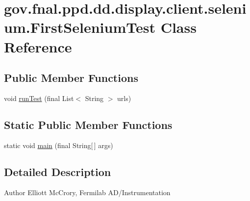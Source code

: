 \hypertarget{classgov_1_1fnal_1_1ppd_1_1dd_1_1display_1_1client_1_1selenium_1_1FirstSeleniumTest}{\section{gov.\-fnal.\-ppd.\-dd.\-display.\-client.\-selenium.\-First\-Selenium\-Test Class Reference}
\label{classgov_1_1fnal_1_1ppd_1_1dd_1_1display_1_1client_1_1selenium_1_1FirstSeleniumTest}
}
\subsection*{Public Member Functions}
\begin{DoxyCompactItemize}
\item 
void \hyperlink{classgov_1_1fnal_1_1ppd_1_1dd_1_1display_1_1client_1_1selenium_1_1FirstSeleniumTest_a2d2a0e6d397cb83c11e764529ea355e5}{run\-Test} (final List$<$ String $>$ urls)
\end{DoxyCompactItemize}
\subsection*{Static Public Member Functions}
\begin{DoxyCompactItemize}
\item 
static void \hyperlink{classgov_1_1fnal_1_1ppd_1_1dd_1_1display_1_1client_1_1selenium_1_1FirstSeleniumTest_a3d9afcec8509f5fdc5c7b837dc86337b}{main} (final String\mbox{[}$\,$\mbox{]} args)
\end{DoxyCompactItemize}


\subsection{Detailed Description}
\begin{DoxyAuthor}{Author}
Elliott Mc\-Crory, Fermilab A\-D/\-Instrumentation 
\end{DoxyAuthor}


